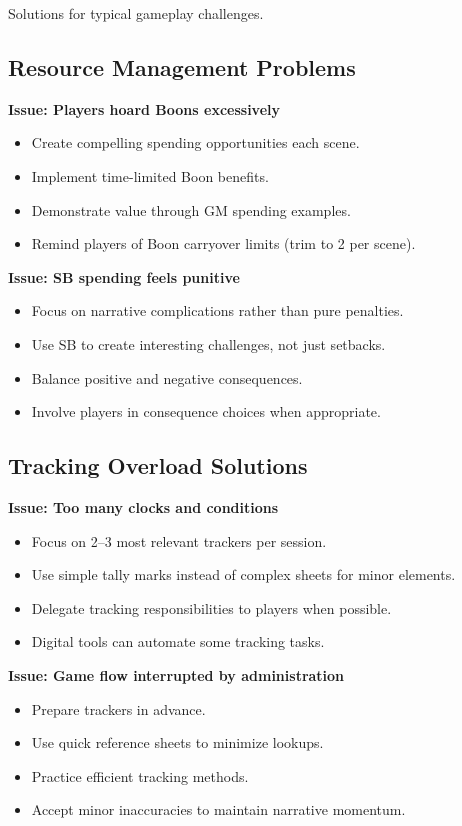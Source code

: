 Solutions for typical gameplay challenges.

\subsection{Resource Management Problems}
\label{subsec:resource-troubleshooting}

\textbf{Issue: Players hoard Boons excessively}
\begin{itemize}
\item Create compelling spending opportunities each scene.
\item Implement time-limited Boon benefits.
\item Demonstrate value through GM spending examples.
\item Remind players of Boon carryover limits (trim to 2 per scene).
\end{itemize}

\textbf{Issue: SB spending feels punitive}
\begin{itemize}
\item Focus on narrative complications rather than pure penalties.
\item Use SB to create interesting challenges, not just setbacks.
\item Balance positive and negative consequences.
\item Involve players in consequence choices when appropriate.
\end{itemize}

\subsection{Tracking Overload Solutions}
\label{subsec:tracking-troubleshooting}

\textbf{Issue: Too many clocks and conditions}
\begin{itemize}
\item Focus on 2--3 most relevant trackers per session.
\item Use simple tally marks instead of complex sheets for minor elements.
\item Delegate tracking responsibilities to players when possible.
\item Digital tools can automate some tracking tasks.
\end{itemize}

\textbf{Issue: Game flow interrupted by administration}
\begin{itemize}
\item Prepare trackers in advance.
\item Use quick reference sheets to minimize lookups.
\item Practice efficient tracking methods.
\item Accept minor inaccuracies to maintain narrative momentum.
\end{itemize}

